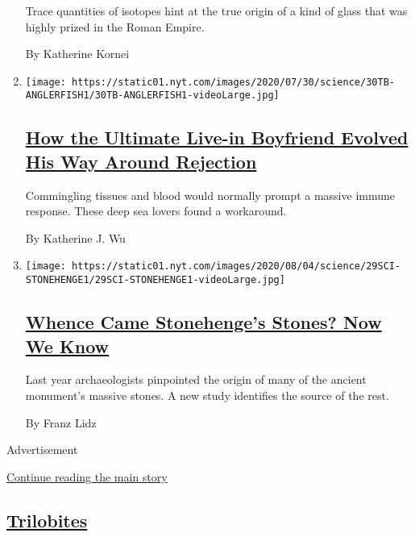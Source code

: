 \begin{enumerate}
  Trace quantities of isotopes hint at the true origin of a kind of
  glass that was highly prized in the Roman Empire.

  By Katherine Kornei
\item
  \texttt{[image: https://static01.nyt.com/images/2020/07/30/science/30TB-ANGLERFISH1/30TB-ANGLERFISH1-videoLarge.jpg]}

  \hypertarget{how-the-ultimate-live-in-boyfriend-evolved-his-way-around-rejection}{%
  \subsection{\texorpdfstring{\href{/2020/07/30/science/anglerfish-immune-rejection.html}{How
  the Ultimate Live-in Boyfriend Evolved His Way Around
  Rejection}}{How the Ultimate Live-in Boyfriend Evolved His Way Around Rejection}}\label{how-the-ultimate-live-in-boyfriend-evolved-his-way-around-rejection}}

  Commingling tissues and blood would normally prompt a massive immune
  response. These deep sea lovers found a workaround.

  By Katherine J. Wu
\item
  \texttt{[image: https://static01.nyt.com/images/2020/08/04/science/29SCI-STONEHENGE1/29SCI-STONEHENGE1-videoLarge.jpg]}

  \hypertarget{whence-came-stonehenges-stones-now-we-know}{%
  \subsection{\texorpdfstring{\href{/2020/07/29/science/stonehenge-archaeology-sarsens.html}{Whence
  Came Stonehenge's Stones? Now We
  Know}}{Whence Came Stonehenge's Stones? Now We Know}}\label{whence-came-stonehenges-stones-now-we-know}}

  Last year archaeologists pinpointed the origin of many of the ancient
  monument's massive stones. A new study identifies the source of the
  rest.

  By Franz Lidz
\end{enumerate}

Advertisement

\protect\hyperlink{after-mid1}{Continue reading the main story}

\hypertarget{trilobites-3}{%
\subsection{\texorpdfstring{\href{/column/trilobites}{Trilobites}}{Trilobites}}\label{trilobites-3}}

